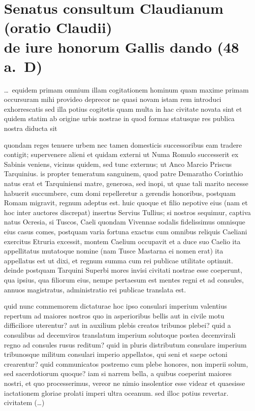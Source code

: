 

\section*{Senatus consultum Claudianum (oratio Claudii) \\de iure honorum Gallis dando (48 a.~D)}
\label{sec:claudius}


\dots\ equidem primam omnium illam cogitationem hominum quam maxime primam occursuram mihi provideo deprecor ne quasi novam istam rem introduci exhorrescatis sed illa potius cogitetis quam multa in hac civitate novata sint et quidem statim ab origine urbis nostrae in quod formas statusque res publica nostra diducta sit 

quondam reges tenuere urbem nec tamen domesticis successoribus eam tradere contigit; supervenere alieni et quidam externi ut Numa Romulo successerit ex Sabinis veniens, vicinus quidem, sed tunc externus; ut Anco Marcio Priscus Tarquinius. is propter temeratum sanguinem, quod patre Demaratho Corinthio natus erat et Tarquiniensi matre, generosa, sed inopi, ut quae tali marito necesse habuerit succumbere, cum domi repelleretur a gerendis honoribus, postquam Romam migravit, regnum adeptus est. huic quoque et filio nepotive eius (nam et hoc inter auctores discrepat) insertus Servius Tullius; si nostros sequimur, captiva natus Ocresia, si Tuscos, Caeli quondam Vivennae sodalis fidelissimus omnisque eius casus comes, postquam varia fortuna exactus cum omnibus reliquis Caeliani exercitus Etruria excessit, montem Caelium occupavit et a duce suo Caelio ita appellitatus mutatoque nomine (nam Tusce Mastarna ei nomen erat) ita appellatus est ut dixi, et regnum summa cum rei publicae utilitate optinuit. deinde postquam Tarquini Superbi mores invisi civitati nostrae esse coeperunt, qua ipsius, qua filiorum eius, nempe pertaesum est mentes regni et ad consules, annuos magistratus, administratio rei publicae translata est.

quid nunc commemorem dictaturae hoc ipso consulari imperium valentius repertum ad maiores nostros quo in asperioribus bellis aut in civile motu difficiliore uterentur? aut in auxilium plebis creatos tribunos plebei? quid a consulibus ad decemviros translatum imperium solutoque postea decemvirali regno ad consules rusus reditum? quid in pluris distributum consulare imperium tribunosque militum consulari imperio appellatos, qui seni et saepe octoni crearentur? quid communicatos postremo cum plebe honores, non imperii solum, sed sacerdotiorum quoque? iam si narrem bella, a quibus coeperint maiores nostri, et quo processerimus, vereor ne nimio insolentior esse videar et quaesisse iactationem gloriae prolati imperi ultra oceanum. sed illoc potius revertar. civitatem (\dots)


